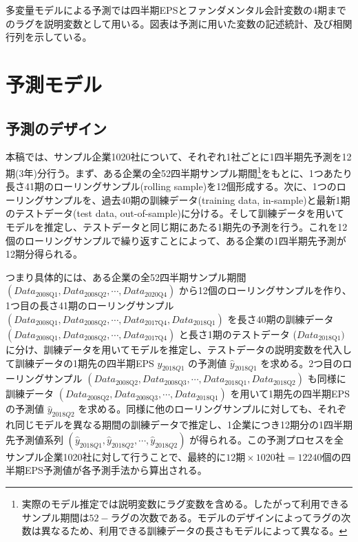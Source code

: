 \documentclass[a4paper, 12pt]{jsreport}
\begin{document}
多変量モデルによる予測では四半期EPSとファンダメンタル会計変数の4期までのラグを説明変数として用いる。図表は予測に用いた変数の記述統計、及び相関行列を示している。


\chapter{予測モデル}

\section{予測のデザイン}

本稿では、サンプル企業1020社について、それぞれ1社ごとに1四半期先予測を12期(3年)分行う。まず、ある企業の全52四半期サンプル期間\footnote{実際のモデル推定では説明変数にラグ変数を含める。したがって利用できるサンプル期間は$52 - ラグの次数 $である。モデルのデザインによってラグの次数は異なるため、利用できる訓練データの長さもモデルによって異なる。}をもとに、1つあたり長さ41期のローリングサンプル(rolling sample)を12個形成する。次に、1つのローリングサンプルを、過去40期の訓練データ(training data, in-sample)と最新1期のテストデータ(test data, out-of-sample)に分ける。そして訓練データを用いてモデルを推定し、テストデータと同じ期にあたる1期先の予測を行う。これを12個のローリングサンプルで繰り返すことによって、ある企業の1四半期先予測が12期分得られる。


つまり具体的には、ある企業の全52四半期サンプル期間 $(Data_{\text{2008Q1}}, Data_{\text{2008Q2}}, \cdots, Data_{\text{2020Q4}})$ から12個のローリングサンプルを作り、1つ目の長さ41期のローリングサンプル $(Data_{\text{2008Q1}}, Data_{\text{2008Q2}}, \cdots, Data_{\text{2017Q4}}, Data_{\text{2018Q1}})$ を長さ40期の訓練データ $(Data_{\text{2008Q1}}, Data_{\text{2008Q2}}, \cdots, Data_{\text{2017Q4}})$ と長さ1期のテストデータ ($Data_{\text{2018Q1}})$ に分け、訓練データを用いてモデルを推定し、テストデータの説明変数を代入して訓練データの1期先の四半期EPS $y_{2018Q1}$ の予測値 $\hat{y}_{2018Q1}$ を求める。2つ目のローリングサンプル $(Data_{\text{2008Q2}}, Data_{\text{2008Q3}}, \cdots, Data_{\text{2018Q1}}, Data_{\text{2018Q2}})$ も同様に 訓練データ $(Data_{\text{2008Q2}}, Data_{\text{2008Q3}}, \cdots, Data_{\text{2018Q1}})$ を用いて1期先の四半期EPSの予測値 $\hat{y}_{2018Q2}$ を求める。同様に他のローリングサンプルに対しても、それぞれ同じモデルを異なる期間の訓練データで推定し、1企業につき12期分の1四半期先予測値系列 $(\hat{y}_{2018Q1}, \hat{y}_{2018Q2}, \cdots, \hat{y}_{2018Q2})$ が得られる。この予測プロセスを全サンプル企業1020社に対して行うことで、最終的に$12期 \times 1020社 = 12240個$の四半期EPS予測値が各予測手法から算出される。
\end{document}
